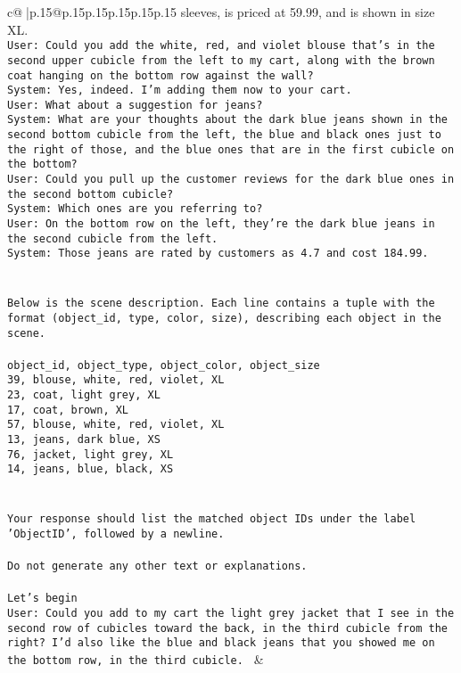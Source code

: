 \documentclass{article}
\begin{document}
{\begin{supertabular}{c@{$\;$}|p{.15\linewidth}@{}p{.15\linewidth}p{.15\linewidth}p{.15\linewidth}p{.15\linewidth}p{.15\linewidth}}
{{{sleeves, is priced at 59.99, and is shown in size XL.\\ \tt User: Could you add the white, red, and violet blouse that's in the second upper cubicle from the left to my cart, along with the brown coat hanging on the bottom row against the wall?\\ \tt System: Yes, indeed. I'm adding them now to your cart.\\ \tt User: What about a suggestion for jeans?\\ \tt System: What are your thoughts about the dark blue jeans shown in the second bottom cubicle from the left, the blue and black ones just to the right of those, and the blue ones that are in the first cubicle on the bottom?\\ \tt User: Could you pull up the customer reviews for the dark blue ones in the second bottom cubicle?\\ \tt System: Which ones are you referring to?\\ \tt User: On the bottom row on the left, they're the dark blue jeans in the second cubicle from the left.\\ \tt System: Those jeans are rated by customers as 4.7 and cost 184.99.\\ \tt \\ \tt \\ \tt Below is the scene description. Each line contains a tuple with the format (object_id, type, color, size), describing each object in the scene.\\ \tt \\ \tt object_id, object_type, object_color, object_size\\ \tt 39, blouse, white, red, violet, XL\\ \tt 23, coat, light grey, XL\\ \tt 17, coat, brown, XL\\ \tt 57, blouse, white, red, violet, XL\\ \tt 13, jeans, dark blue, XS\\ \tt 76, jacket, light grey, XL\\ \tt 14, jeans, blue, black, XS\\ \tt \\ \tt \\ \tt Your response should list the matched object IDs under the label 'ObjectID', followed by a newline.\\ \tt \\ \tt Do not generate any other text or explanations.\\ \tt \\ \tt Let's begin\\ \tt User: Could you add to my cart the light grey jacket that I see in the second row of cubicles toward the back, in the third cubicle from the right? I'd also like the blue and black jeans that you showed me on the bottom row, in the third cubicle. 
	  } 
	   } 
	   } 
	 & \\ 
 


\end{supertabular}}
\end{document}
